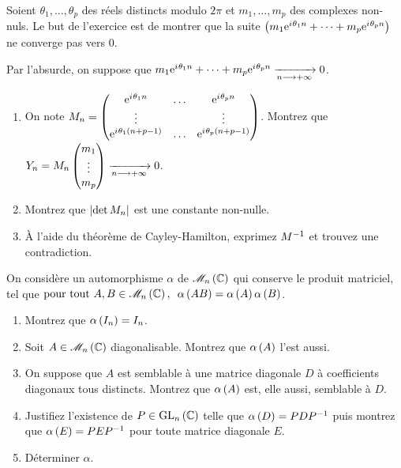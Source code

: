 \begin{corr}
\end{corr}

\begin{exo}
Soient \(\theta_1,\dots,\theta_p\) des réels distincts modulo \(2\pi\) et \(m_1,\dots,m_p\) des complexes non-nuls. Le but de l'exercice est de montrer que la suite \(\left(m_1\mathrm{e}^{i\mkern1mu\theta_1n}+\dots+m_p\mathrm{e}^{i\mkern1mu\theta_pn}\right)\) ne converge pas vers \(0\).

Par l'absurde, on suppose que \(m_1\mathrm{e}^{i\mkern1mu\theta_1n}+\dots+m_p\mathrm{e}^{i\mkern1mu\theta_pn}\xrightarrow[n\longrightarrow+\infty]{}0\).

\begin{enumerate}
    \item On note \(M_n=\begin{pmatrix}
        \mathrm{e}^{i\mkern1mu\theta_1n} & \dots & \mathrm{e}^{i\mkern1mu\theta_pn} \\
        \vdots &  & \vdots \\
        \mathrm{e}^{i\mkern1mu\theta_1\left(n+p-1\right)} & \dots & \mathrm{e}^{i\mkern1mu\theta_p\left(n+p-1\right)}
    \end{pmatrix}\). Montrez que \(Y_n=M_n\begin{pmatrix}m_1\\\vdots\\m_p\end{pmatrix}\xrightarrow[n\longrightarrow+\infty]{}0\). \\
    \item Montrez que \(\left\lvert\det M_n\right\rvert\) est une constante non-nulle. \\
    \item À l'aide du théorème de Cayley-Hamilton, exprimez \(M^{-1}\) et trouvez une contradiction.
\end{enumerate}
\end{exo}

\begin{corr}
\end{corr}

\begin{exo}
On considère un automorphisme \(\alpha\) de \(\M{n}[\C]\) qui conserve le produit matriciel, \cad tel que \(\quantifs{\tpt A,B\in\M{n}[\C]}\alpha\paren{AB}=\alpha\paren{A}\alpha\paren{B}\).

\begin{enumerate}
    \item Montrez que \(\alpha\left(I_n\right)=I_n\). \\
    \item Soit \(A\in\M{n}[\C]\) diagonalisable. Montrez que \(\alpha\left(A\right)\) l'est aussi. \\
    \item On suppose que \(A\) est semblable à une matrice diagonale \(D\) à coefficients diagonaux tous distincts. Montrez que \(\alpha\left(A\right)\) est, elle aussi, semblable à \(D\). \\
    \item Justifiez l'existence de \(P\in\GL{n}[\C]\) telle que \(\alpha\left(D\right)=PDP^{-1}\) puis montrez que \(\alpha\left(E\right)=PEP^{-1}\) pour toute matrice diagonale \(E\). \\
    \item Déterminer \(\alpha\).
\end{enumerate}
\end{exo}

